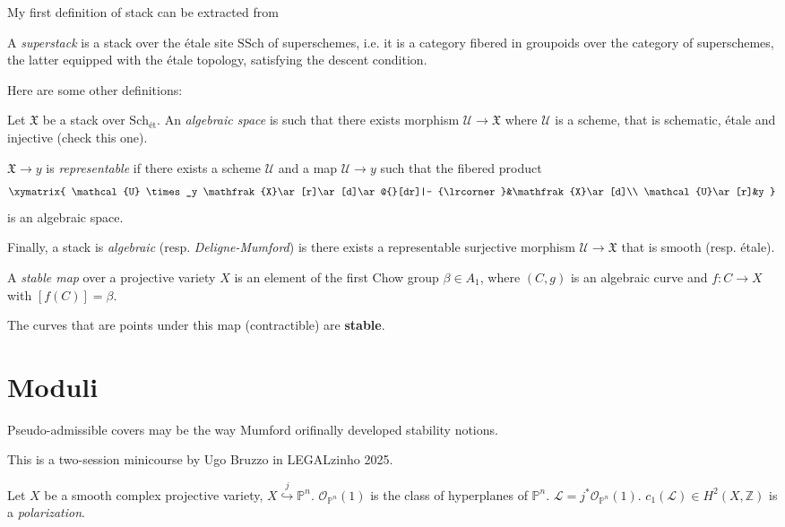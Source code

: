 \documentclass{book}
\begin{document}
My first definition of stack can be extracted
from

\begin{definition}
\label{definition-superstack}
A {\it superstack} is a stack over
the étale site $\text{SSch}$ of superschemes,
i.e. it is a category fibered in groupoids
over the category of superschemes,
the latter equipped with the
étale topology,
satisfying the descent condition.
\end{definition}

Here are some other definitions:

\begin{definition}
\label{definition-algebraic-stacks}
Let  $\mathfrak{X}$ be a stack over
$\text{Sch}_{\text{ét}}$.
An {\it algebraic space} is
such that there exists morphism
$\mathcal{U} \to \mathfrak{X}$
where $\mathcal{U}$ is a scheme, that is
schematic, étale and injective (check this
one).

$\mathfrak{X} \to y$ is {\it representable}
if
there exists a scheme $\mathcal{U}$ and a map
$\mathcal{U} \to y$ such that the
fibered product
$$
\xymatrix{
\mathcal{U} \times_y
\mathfrak{X}\ar[r]\ar[d]\ar@{}[dr]|-
{\lrcorner}&\mathfrak{X}\ar[d]\\
\mathcal{U}\ar[r]&y
}
$$
is an algebraic space.

Finally, a  stack is {\it algebraic} (resp.
{\it Deligne-Mumford})
is there exists a
representable surjective morphism
$\mathcal{U} \to \mathfrak{X}$
that is smooth (resp. étale).

A {\it stable map} over a projective
variety $X$ is an element of the first
Chow group $\beta \in A_1$, where
 $(C,g)$ is an algebraic curve and
$f:C \to X$ with $[f(C)]=\beta$.
\end{definition}

\noindent
The curves that are points under this map
(contractible) are {\bf stable}.

\section{Moduli}
\label{section-moduli}

\noindent
Pseudo-admissible covers may be the way
Mumford orifinally developed stability
notions.

\noindent
This is a two-session minicourse by Ugo
Bruzzo
in LEGALzinho 2025.

Let $X$ be a smooth complex projective
variety,
$X \overset{j}{\hookrightarrow}\mathbb{P}^n$.
$\mathcal{O}_{\mathbb{P}^n}(1)$ is the class
of hyperplanes of $\mathbb{P}^n$.
$\mathcal{L}=j^*\mathcal{O}_{\mathbb{P}^n}(1)
$.
$c_1(\mathcal{L})\in H^2(X,\mathbb{Z})$ is
a {\it polarization}.
\end{document}
